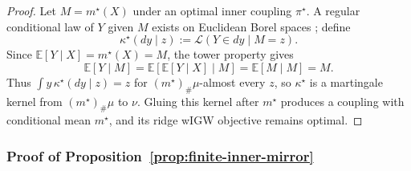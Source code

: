 \documentclass[11pt]{article}
\newcommand{\E}{\mathbb E}
\theoremstyle{plain}
\theoremstyle{definition}
\theoremstyle{remark}
\begin{document}
\begin{proof}
Let $M=m^\star(X)$ under an optimal inner coupling $\pi^\star$.  A regular
conditional law of $Y$ given $M$ exists on Euclidean Borel spaces
\cite[Theorems~3.4 and~8.5]{Kallenberg}; define
\[
 \kappa^\star(dy\mid z):=\mathcal L(Y\in dy\mid M=z).
\]
Since $\E[Y\mid X]=m^\star(X)=M$, the tower property gives
\[
 \E[Y\mid M]=\E[\E[Y\mid X]\mid M]=\E[M\mid M]=M.
\]
Thus $\int y\,\kappa^\star(dy\mid z)=z$ for $(m^\star)_\#\mu$-almost every $z$,
so $\kappa^\star$ is a martingale kernel from $(m^\star)_\#\mu$ to $\nu$.  Gluing
this kernel after $m^\star$ produces a coupling with conditional mean $m^\star$,
and its ridge wIGW objective remains optimal.
\end{proof}

\subsubsection{Proof of Proposition~\ref{prop:finite-inner-mirror}}
\label{proof:11.1}\label{proof:finite-inner-mirror}
\end{document}
